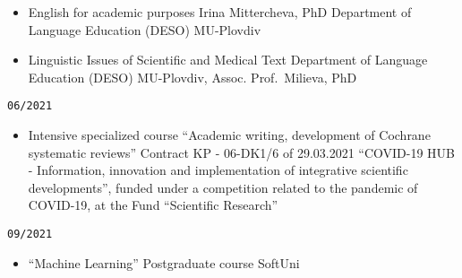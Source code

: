 \documentclass[
  12pt,
  letterpaper,
  DIV=11,
  numbers=noendperiod]{scrartcl}
\providecommand{\tightlist}{%
  \setlength{\itemsep}{0pt}\setlength{\parskip}{0pt}}\usepackage{longtable,booktabs,array}
\begin{document}
\begin{itemize}
\item
  English for academic purposes \textbar{} Irina Mittercheva, PhD
  \textbar{} Department of Language Education (DESO) \textbar{}
  MU-Plovdiv
\item
  Linguistic Issues of Scientific and Medical Text \textbar{} Department
  of Language Education (DESO) \textbar{} MU-Plovdiv, Assoc.
  Prof.~Milieva, PhD
\end{itemize}

\texttt{06/2021}

\begin{itemize}
\tightlist
\item
  Intensive specialized course \textbar{} ``Academic writing,
  development of Cochrane systematic reviews'' \textbar{} Contract KP -
  06-DK1/6 of 29.03.2021 \textbar{} ``COVID-19 HUB - Information,
  innovation and implementation of integrative scientific
  developments'', funded under a competition related to the pandemic of
  COVID-19, at the Fund ``Scientific Research''
\end{itemize}

\texttt{09/2021}

\begin{itemize}
\tightlist
\item
  ``Machine Learning'' Postgraduate course \textbar{} SoftUni
\end{itemize}
\end{document}
